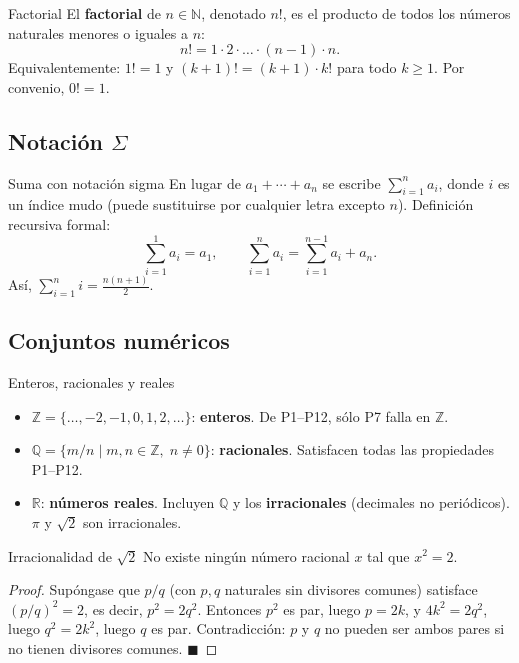 \documentclass[12pt]{article}
\begin{document}
\begin{definicion}[]{Factorial}
El \textbf{factorial} de $n \in \mathbb{N}$, denotado $n!$, es el producto de todos los números naturales menores o iguales a $n$:
\[ n! = 1 \cdot 2 \cdot \ldots \cdot (n-1) \cdot n. \]
Equivalentemente: $1! = 1$ y $(k+1)! = (k+1) \cdot k!$ para todo $k \geq 1$. Por convenio, $0! = 1$.
\end{definicion}

\subsection{Notación $\Sigma$}

\begin{nota}[]{Suma con notación sigma}
En lugar de $a_1 + \cdots + a_n$ se escribe $\displaystyle\sum_{i=1}^{n} a_i$, donde $i$ es un índice mudo (puede sustituirse por cualquier letra excepto $n$). Definición recursiva formal:
\[ \sum_{i=1}^{1} a_i = a_1, \qquad \sum_{i=1}^{n} a_i = \sum_{i=1}^{n-1} a_i + a_n. \]
Así, $\displaystyle\sum_{i=1}^{n} i = \frac{n(n+1)}{2}$.
\end{nota}

\subsection{Conjuntos numéricos}

\begin{definicion}[]{Enteros, racionales y reales}
\begin{itemize}
  \item $\mathbb{Z} = \{\ldots,-2,-1,0,1,2,\ldots\}$: \textbf{enteros}. De P1--P12, sólo P7 falla en $\mathbb{Z}$.
  \item $\mathbb{Q} = \{m/n \mid m,n \in \mathbb{Z},\; n \neq 0\}$: \textbf{racionales}. Satisfacen todas las propiedades P1--P12.
  \item $\mathbb{R}$: \textbf{números reales}. Incluyen $\mathbb{Q}$ y los \textbf{irracionales} (decimales no periódicos). $\pi$ y $\sqrt{2}$ son irracionales.
\end{itemize}
\end{definicion}

\begin{proposicion}[]{Irracionalidad de $\sqrt{2}$}
No existe ningún número racional $x$ tal que $x^2 = 2$.
\end{proposicion}

\begin{proof}
Supóngase que $p/q$ (con $p, q$ naturales sin divisores comunes) satisface $(p/q)^2 = 2$, es decir, $p^2 = 2q^2$. Entonces $p^2$ es par, luego $p = 2k$, y $4k^2 = 2q^2$, luego $q^2 = 2k^2$, luego $q$ es par. Contradicción: $p$ y $q$ no pueden ser ambos pares si no tienen divisores comunes.
$\blacksquare$
\end{proof}
\end{document}
